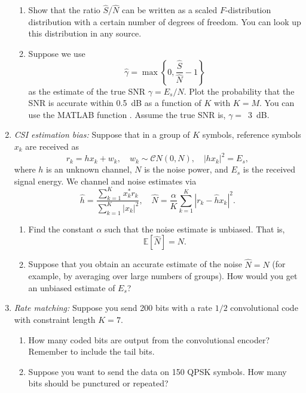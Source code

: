 \documentclass[11pt]{article}
\def\Exp{\mathbb{E}}
\begin{document}
\begin{enumerate}
\begin{enumerate}[label=(\alph*)]
\item Show that the ratio $\widehat{S}/\widehat{N}$ can be written as a scaled $F$-distribution
distribution with a certain number of degrees of freedom.
You can look up this distribution in any source.

\item Suppose we use
\[
    \widehat{\gamma} = \max\left\{ 0, \frac{\widehat{S}}{\widehat{N}} - 1\right\}
\]
as the estimate of the true SNR $\gamma = E_s/N$.
Plot the probability that the SNR is accurate within \SI{0.5}{dB} as a function of $K$ with $K=M$.
You can use the MATLAB function .
Assume the true SNR is, $\gamma = $\, \SI{3}{dB}.
\end{enumerate}

\item \emph{CSI estimation bias:}  Suppose that in a group of $K$ symbols,
reference symbols $x_k$ are received as
\[
    r_k = hx_k + w_k, \quad w_k \sim {\mathcal CN}(0,N),
    \quad |hx_k|^2 = E_s,
\]
where $h$ is an unknown channel, $N$ is the noise power, and $E_s$ is the received signal energy.
We channel and noise estimates via
\[
    \widehat{h} = \frac{ \sum_{k=1}^K x_k^*r_k } {\sum_{k=1}^K |x_k|^2 },
    \quad
    \widehat{N} = \frac{\alpha }{K} \sum_{k=1}^K |r_k - \widehat{h}x_k|^2.
\]
\begin{enumerate}[label=(\alph*)]
\item Find the constant $\alpha$ such that the noise estimate is unbiased.  That is,
\[
    \Exp\left[ \widehat{N} \right] = N.
\]
\item Suppose that you obtain an accurate estimate of the noise $\widehat{N}=N$
(for example, by averaging over large numbers of groups).  How would you get an unbiased
estimate of $E_s$?
\end{enumerate}




\item \emph{Rate matching:}  Suppose you send 200 bits with a rate $1/2$ convolutional code
with constraint length $K=7$.
\begin{enumerate}[label=(\alph*)]
\item How many coded bits are output from the convolutional encoder?  Remember to include
the tail bits.

\item Suppose you want to send the data on 150 QPSK symbols.  How many bits should be punctured or
repeated?
\end{enumerate}


\end{enumerate}
\end{document}
